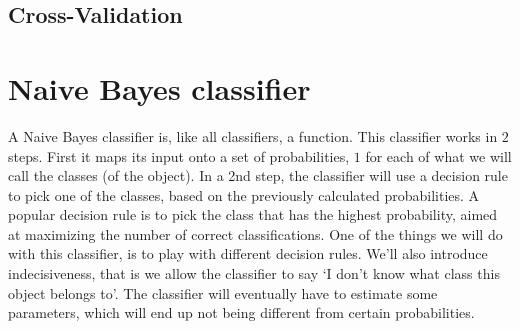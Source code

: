 \documentclass{report}
\theoremstyle{definition}
\begin{document}
	\section{Cross-Validation}

\chapter{Naive Bayes classifier} 
A Naive Bayes classifier is, like all classifiers, a function. This classifier works in $2$ steps. First it maps its input onto a set of probabilities, $1$ for each of what we will call the classes (of the object). In a 2nd step, the classifier will use a decision rule to pick one of the classes, based on the previously calculated probabilities. A popular decision rule is to pick the class that has the highest probability, aimed at maximizing the number of correct classifications. One of the things we will do with this classifier, is to play with different decision rules. We'll also introduce indecisiveness, that is we allow the classifier to say  \lq I don't know what class this object belongs to'. The classifier will eventually have to estimate some parameters, which will end up not being different from certain probabilities.
\end{document}
